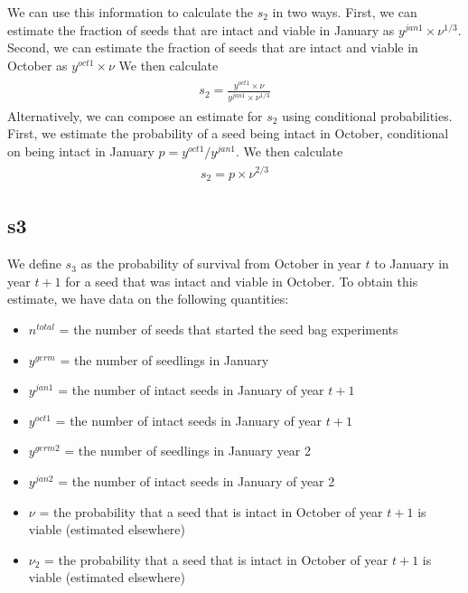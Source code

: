 \documentclass[12pt, oneside]{article}   	%
\begin{document}
We can use this information to calculate the $s_2$ in two ways. First, we can estimate the fraction of seeds that are intact and viable in January as $y^{jan1}\times \nu^{1/3}$. Second, we can estimate the fraction of seeds that are intact and viable in October as $y^{oct1}\times \nu$ We then calculate 
%
    \begin{align}
\begin{split}
s_2 = \frac{ y^{oct1}\times \nu }{ y^{jan1}\times \nu^{1/3} }
  \end{split}
\end{align}
%
Alternatively, we can compose an estimate for $s_2$ using conditional probabilities. First, we estimate the probability of a seed being intact in October, conditional on being intact in January $ p = y^{oct1} / y^{jan1} $. We then calculate 
%
    \begin{align}
\begin{split}
s_2 = p \times \nu^{2/3}
  \end{split}
\end{align}
%
\subsection*{s3}

We define $s_3$ as the probability of survival from October in year $t$ to January in year $t+1$ for a seed that was intact and viable in October. To obtain this estimate, we have data on the following quantities:

\begin{itemize}
	\item $n^{total}$ = the number of seeds that started the seed bag experiments
	\item $y^{germ}$ = the number of seedlings in January
	\item $y^{jan1}$ = the number of intact seeds in January of year $t+1$
	\item $y^{oct1}$ = the number of intact seeds in January of year $t+1$
	\item $y^{germ2}$ = the number of seedlings in January year 2
	\item $y^{jan2}$ = the number of intact seeds in January of year 2
	\item $\nu$ = the probability that a seed that is intact in October of year $t+1$ is viable (estimated elsewhere)
	\item $\nu_2$ = the probability that a seed that is intact in October of year $t+1$ is viable (estimated elsewhere)

\end{itemize}
\end{document}
